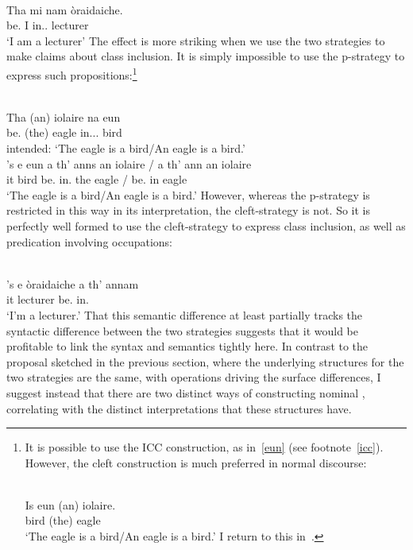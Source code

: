 \documentclass[output=paper]{langsci/langscibook}
\begin{document}
\ea {}\\
\gll Tha mi nam \`oraidaiche.\\
be.\Prs{} I in.\Poss.\Fsg{} lecturer\\
\glt \enquote*{I am a lecturer}
\z
The effect is more striking when we use the two strategies to make claims about
class inclusion. It is simply impossible to use the p-strategy to express such
propositions:\footnote{\label{generic}It is possible to use the ICC
    construction, as in~\eqref{eun} (see footnote~\ref{icc}). However, the
    cleft construction is much preferred in normal discourse:

\ea\label{eun}
\\
\gll Is eun (an) iolaire.\\
\Cop{} bird (the) eagle\\
\glt \enquote*{The eagle is a bird/An eagle is a bird.}
\z
I return to this in~.}

\ea {}\\
    \gll * Tha (an) iolaire na eun\\
         {} be.\Prs{} (the) eagle in.\Poss.\Tsg.\M{} bird\\
\glt {} intended: `The eagle is a bird/An eagle is a bird.'
\ex {}\\
\gll  's e eun a th' anns  an iolaire / a th' {ann an} iolaire\\
\Cop{} it bird \Rel{} be.\Prs{} in.\Def{} the eagle / \Rel{} be.\Prs{} in eagle\\
\glt \enquote*{The eagle is a bird/An eagle is a bird.}
\z
However, whereas the p-strategy is restricted in this way in its
interpretation, the cleft-strategy is not. So it is perfectly well formed to
use the cleft-strategy to express class inclusion, as well as predication
involving occupations:

\ea {}\\
\gll 's e \`oraidaiche a th' annam\\
 \Cop{} it lecturer \Rel{} be.\Prs{} in.\Fsg{}\\
\glt \enquote*{I'm a lecturer.}
\z
That this semantic difference at least partially tracks the syntactic
difference between the two strategies suggests that it would be profitable to
link the syntax and semantics tightly here. In contrast to the proposal
sketched in the previous section, where the underlying structures for the two
strategies are the same, with  operations driving the surface
differences, I suggest instead  that there are two distinct ways of
constructing nominal , correlating with the distinct interpretations
that these structures have.
\end{document}
